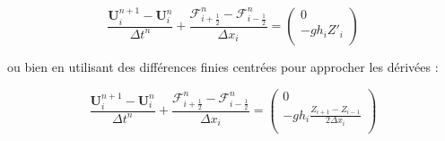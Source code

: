 \documentclass[
11pt, %
francais, %
singlespacing, %
headsepline, %
]{MastersDoctoralThesis} %
\theoremstyle{definition}
\begin{document}
\[\frac{\textbf{U}_i^{n+1}-\textbf{U}_i^{n}}{\Delta t^n}+\frac{\mathcal{F}_{i+\frac{1}{2}}^n - \mathcal{F}_{i-\frac{1}{2}}^n}{\Delta x_i}= \begin{pmatrix}
0 \\
-gh_i Z'_i\\
\end{pmatrix}\]

ou bien en utilisant des différences finies centrées pour approcher les
dérivées :

\[\frac{\textbf{U}_i^{n+1}-\textbf{U}_i^{n}}{\Delta t^n}+\frac{\mathcal{F}_{i+\frac{1}{2}}^n - \mathcal{F}_{i-\frac{1}{2}}^n}{\Delta x_i}= \begin{pmatrix}
0 \\
-gh_i \frac{Z_{i+1}-Z_{i-1}}{2\Delta x_i}\\
\end{pmatrix}\]
\end{document}
